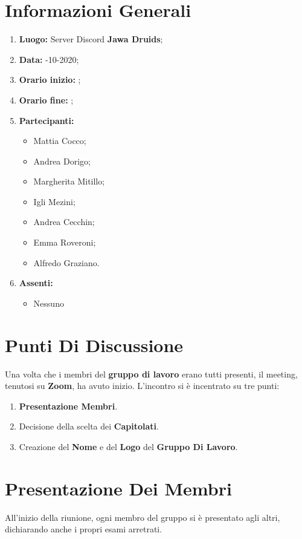 	\newpage
	\section{Informazioni Generali}
	\begin{enumerate}
		\item \textbf{Luogo:} \normalfont Server Discord \textbf{Jawa Druids};
		\item \textbf{Data:} -10-2020;
		\item \textbf{Orario inizio:} ;
		\item \textbf{Orario fine:} ;
		\item \textbf{Partecipanti:}
		\begin{itemize}
			\item Mattia Cocco;
			\item Andrea Dorigo;
			\item Margherita Mitillo;
			\item Igli Mezini;
			\item Andrea Cecchin;
			\item Emma Roveroni;
			\item Alfredo Graziano.
		\end{itemize}
		\item \textbf{Assenti:}
		\begin{itemize}
			\item Nessuno
		\end{itemize}
	\end{enumerate}
	\section{Punti Di Discussione}
	Una volta che i membri del \textbf{gruppo di lavoro} erano tutti presenti, il meeting, tenutosi su \textbf{Zoom}, ha avuto inizio.
	L'incontro si è incentrato su tre punti:
	\begin{enumerate}
		\item \textbf{Presentazione Membri}.		
		\item Decisione della scelta dei \textbf{Capitolati}.
		\item Creazione del \textbf{Nome} e del \textbf{Logo} del \textbf{Gruppo Di Lavoro}.
	\end{enumerate}

	\section{Presentazione Dei Membri}
	All'inizio della riunione, ogni membro del gruppo si è presentato agli altri, dichiarando anche i propri esami arretrati.

